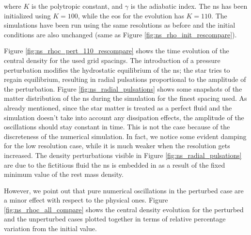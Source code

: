 \documentclass[11pt, a4paper]{article}
\begin{document}
\noindent
where \(K\) is the polytropic constant, and \(\gamma\) is the adiabatic index. The \acrlong{ns} has been initialized using \(K = 100\), while the \acrshort{eos} for the evolution has \(K = 110\). The simulations have been run using the same resolutions as before and the initial conditions are also unchanged (same as Figure \ref{fig:ns_rho_init_rescompare}).

Figure \ref{fig:ns_rhoc_pert_110_rescompare} shows the time evolution of the central density for the used grid spacings. The introduction of a pressure perturbation modifies the hydrostatic equilibrium of the \acrshort{ns}; the star tries to regain equilibrium, resulting in radial pulsations proportional to the amplitude of the perturbation. Figure \ref{fig:ns_radial_pulsations} shows some snapshots of the matter distribution of the \acrshort{ns} during the simulation for the finest spacing used. As already mentioned, since the star matter is treated as a perfect fluid and the simulation doesn't take into account any dissipation effects, the amplitude of the oscillations should stay constant in time. This is not the case because of the discreteness of the numerical simulation. In fact, we notice some evident damping for the low resolution case, while it is much weaker when the resolution gets increased. The density perturbations visible in Figure \ref{fig:ns_radial_pulsations} are due to the fictitious fluid the \acrshort{ns} is embedded in as a result of the fixed minimum value of the rest mass density.

However, we point out that pure numerical oscillations in the perturbed case are a minor effect with respect to the physical ones. Figure \ref{fig:ns_rhoc_all_compare} shows the central density evolution for the perturbed and the unperturbed cases plotted together in terms of relative percentage variation from the initial value.

\newpage
\end{document}
